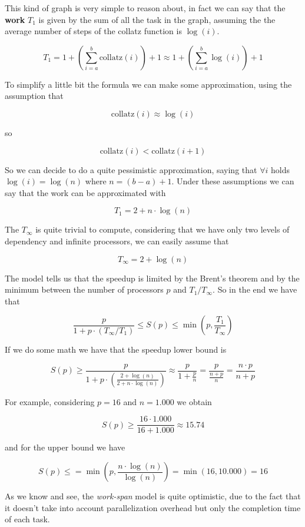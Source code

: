 \documentclass[12pt, a4paper]{article}
\begin{document}
This kind of graph is very simple to reason about, in fact we can say that the
\textbf{work} $T_1$ is given by the sum of all the task in the graph, assuming
the the average number of steps of the collatz function is $\log{(i)}$.

\[
  T_1 = 1 + \left( \sum_{i=a}^b \text{collatz} (i) \right) + 1
  \approx 1 + \left( \sum_{i=a}^b \log{(i)} \right) + 1 
\]

To simplify a little bit the formula we can make some approximation, using the
assumption that

\[ \text{collatz} (i) \approx  \log{(i)} \]

so 

\[ \text{collatz} (i) < \text{collatz} (i+1) \]

So we can decide to do a quite pessimistic approximation, saying that
$\forall i$ holds $\log{(i)} = \log{(n)}$ where $n = (b-a)+1$. Under these
assumptions we can say that the work can be approximated with

\[ T_1 = 2 + n \cdot \log{(n)} \]

The  $T_\infty$ is quite trivial to compute, considering that we have
only two levels of dependency and infinite processors, we can easily assume that

\[ T_\infty = 2 + \log (n) \]

The  model tells us that the speedup is limited by the Brent's
theorem and by the minimum between the number of processors $p$ and 
$T_1 / T_\infty$. So in the end we have that

\[
  \frac{p}{1 + p \cdot (T_\infty / T_1)} \leq S(p) \leq
  \min{\left( p, \frac{T_1}{T_\infty} \right)}
\]

If we do some math we have that the speedup lower bound is

\[
  S(p) \geq \frac{p}{1 + p \cdot 
  \left( \frac{2 + \log(n)}{2 + n \cdot \log(n)} \right)} \approx
  \frac{p}{1 + \frac{p}{n}} = \frac{p}{\frac{n + p}{n}} =
  \frac{n \cdot p}{n + p}
\]

For example, considering $p = 16$ and $n = 1.000$ we obtain

\[ S(p) \geq \frac{16 \cdot 1.000}{16 + 1.000} \approx 15.74 \]

and for the upper bound we have

\[
  S(p) \leq = \min{\left( p, \frac{n \cdot \log(n)}{\log(n)} \right)} =
  \min{\left( 16, 10.000 \right)} = 16
\]

As we know and see, the \emph{work-span} model is quite optimistic, due to the
fact that it doesn't take into account parallelization overhead but only the
completion time of each task.
\end{document}
